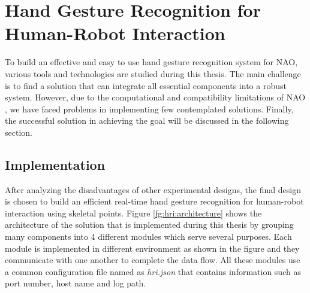 \chapter{Hand Gesture Recognition for Human-Robot Interaction} \label{ch:solution} To build an effective and easy to use hand gesture recognition system for NAO, various tools and technologies are studied during this thesis. The main challenge is to find a solution that can integrate all essential components into a robust system. However, due to the computational and compatibility limitations of NAO \cite{17}, we have faced problems in implementing few contemplated solutions. Finally, the successful solution in achieving the goal will be discussed in the following section.

\section{Implementation} \label{sec:sol:impl} After analyzing the disadvantages of other experimental designs, the final design is chosen to build an efficient real-time hand gesture recognition for human-robot interaction using skeletal points. Figure \ref{fg:hri:architecture} shows the architecture of the solution that is implemented during this thesis by grouping many components into 4 different modules which serve several purposes. Each module is implemented in different environment as shown in the figure and they communicate with one another to complete the data flow. All these modules use a common configuration file named as \textit{hri.json} that contains information such as port number, host name and log path.




 






